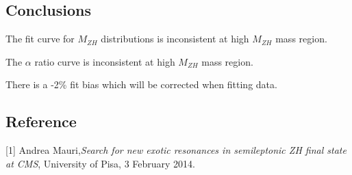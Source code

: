 \documentclass[a0,portrait]{a0poster}
\begin{document}
\begin{center}
\begin{multicols}{2}
    \vspace{0.4em}

    \begin{textbox2}
      \section*{\color{FireBrick} Conclusions}

      \begin{item0}
      \item The fit curve for $M_{ZH}$ distributions is inconsistent at high $M_{ZH}$ mass region.
      \item The $\alpha$ ratio curve is inconsistent at high $M_{ZH}$ mass region.
      \item There is a -2\% fit bias which will be corrected when fitting data.
      \end{item0}

    \end{textbox2}

    \vspace{0.4em}
    
    \begin{textbox2}
      \section*{\color{FireBrick} Reference}
               [1] Andrea Mauri,\emph{Search for new exotic resonances in semileptonic ZH final state at CMS}, University of Pisa, 3 February 2014.
    \end{textbox2}

  \end{multicols}
  
\end{center}
\end{document}
